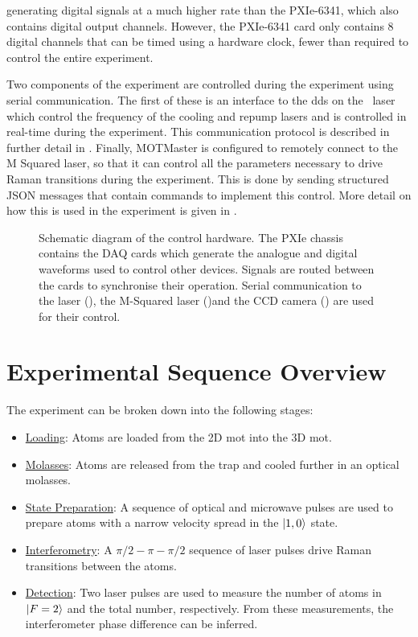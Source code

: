 generating digital signals at a much higher rate than the PXIe-6341, which
also contains digital output channels. However, the PXIe-6341 card only
contains 8 digital channels that can be timed using a hardware clock, fewer
than required to control the entire experiment.
\par\noindent
Two components of the experiment are controlled during the experiment using
serial communication. The first of these is an interface to the \ac{dds} on
the \Muquans\ laser which control the frequency of the cooling and repump
lasers and is controlled in real-time during the experiment. This
communication protocol is described in further detail in
. Finally, MOTMaster is configured to remotely connect to the M
Squared laser, so that it can control all the parameters necessary to drive
Raman transitions during the experiment. This is done by sending structured
JSON messages that contain commands to implement this control. More detail on how this is used in the experiment is given in
.
\begin{figure}[!htbp]
    \centering
    \fontsize{16pt}{14pt}
    \resizebox{1\textwidth}{!}{}
    \caption[Control hardware schematic diagram]{Schematic diagram of the control hardware. The PXIe chassis contains the DAQ cards which generate the analogue and digital waveforms used to control other devices. Signals are routed between the cards to synchronise their operation. Serial communication to the \Muquans laser (), the M-Squared laser ()and the CCD camera () are used for their control.}
    \label{fig:control_hardware}
\end{figure}

\section{Experimental Sequence Overview}
The experiment can be broken down into the following stages:
\begin{itemize}
    \item \underline{Loading}: Atoms are loaded from the 2D \ac{mot} into the 3D \ac{mot}.
    \item \underline{Molasses}: Atoms are released from the trap and cooled further in an optical molasses.
    \item \underline{State Preparation}: A sequence of optical and microwave pulses are used to prepare atoms with a narrow velocity spread in the \(\ket{1,0}\) state.
    \item \underline{Interferometry}: A \(\pi/2 - \pi - \pi/2\) sequence of laser pulses drive Raman transitions between the atoms.
    \item \underline{Detection}: Two laser pulses are used to measure the number of atoms in \(\ket{F=2}\) and the total number, respectively. From these measurements, the interferometer phase difference can be inferred.
\end{itemize}
